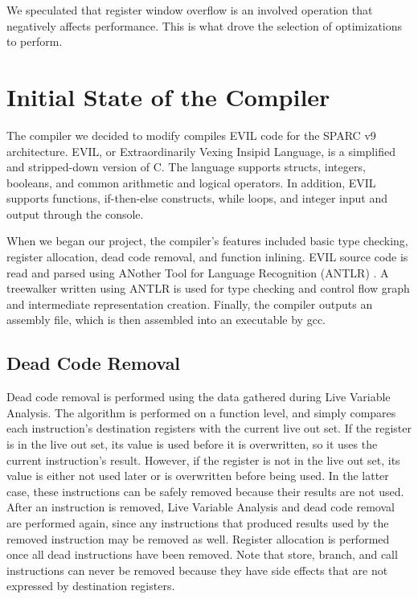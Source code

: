 \documentclass[12pt]{article}
\begin{document}
We speculated that register window overflow is an involved operation that negatively affects performance.
This is what drove the selection of optimizations to perform.

\section{Initial State of the Compiler}
The compiler we decided to modify compiles EVIL code for the SPARC v9 architecture.
EVIL, or Extraordinarily Vexing Insipid Language, is a simplified and stripped-down version of C.
The language supports structs, integers, booleans, and common arithmetic and logical operators.
In addition, EVIL supports functions, if-then-else constructs, while loops, and integer input and output through the console.

When we began our project, the compiler's features included basic type checking, register allocation, dead code removal, and function inlining.
EVIL source code is read and parsed using ANother Tool for Language Recognition (ANTLR) \cite{antlr}.
A treewalker written using ANTLR is used for type checking and control flow graph and intermediate representation creation.
Finally, the compiler outputs an assembly file, which is then assembled into an executable by gcc.

\subsection{Dead Code Removal}
Dead code removal is performed using the data gathered during Live Variable Analysis.
The algorithm is performed on a function level, and simply compares each instruction's destination registers with the current live out set.
If the register is in the live out set, its value is used before it is overwritten, so it uses the current instruction's result.
However, if the register is not in the live out set, its value is either not used later or is overwritten before being used.
In the latter case, these instructions can be safely removed because their results are not used.
After an instruction is removed, Live Variable Analysis and dead code removal are performed again, since any instructions that produced results used by the removed instruction may be removed as well.
Register allocation is performed once all dead instructions have been removed.
Note that store, branch, and call instructions can never be removed because they have side effects that are not expressed by destination registers.
\end{document}
